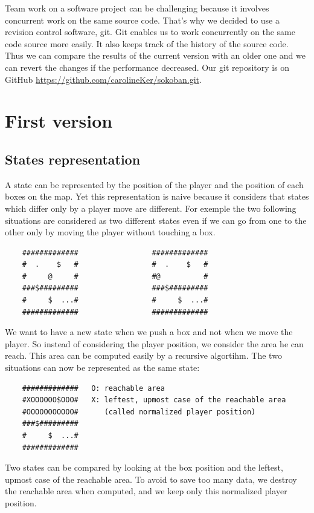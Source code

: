 \documentclass[a4paper,10pt]{article}
\begin{document}
	Team work on a software project can be challenging because it involves concurrent work on the same source code. 
	That's why we decided to use a revision control software, git. 
	Git enables us to work concurrently on the same code source more easily.
	It also keeps track of the history of the source code.
	Thus we can compare the results of the current version with an older one
	and we can revert the changes if the performance decreased.
	Our git repository is on GitHub \url{https://github.com/carolineKer/sokoban.git}.

\section{First version}
	\subsection{States representation}
	A state can be represented by the position of the player and the position of each boxes on the map. 
	Yet this representation is naive because it considers that states which differ only by a player move are different.
	For exemple the two following situations are considered as two different states even if we can go from one to the other only by moving the 
	player without touching a box.
	
	\begin{verbatim}
	#############                 #############
	#  .    $   #                 #  .    $   #
	#     @     #                 #@          #
	###$#########                 ###$#########
	#     $  ...#                 #     $  ...#
	#############                 #############
	\end{verbatim}
	

	We want to have a new state when we push a box and not when we move the player.
	So instead of considering the player position, we consider the area he can reach.
	This area can be computed easily by a recursive algortihm.
	The two situations can now be represented as the same state:
	\begin{verbatim}
	#############   O: reachable area
	#XOOOOOO$OOO#   X: leftest, upmost case of the reachable area 
	#OOOOOOOOOOO#      (called normalized player position)
	###$#########
	#     $  ...#
	#############
	\end{verbatim}
	Two states can be compared by looking at the box position and the leftest, upmost case of the reachable area.
	To avoid to save too many data, we destroy the reachable area when computed, and we keep only this normalized player position.
\end{document}

